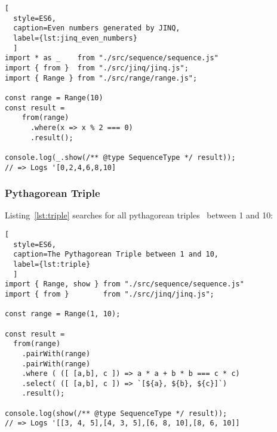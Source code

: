 \begin{lstlisting}[
  style=ES6, 
  caption=Even numbers generated by JINQ,
  label={lst:jinq_even_numbers}
  ]
import * as _    from "./src/sequence/sequence.js"
import { from }  from "./src/jinq/jinq.js";
import { Range } from "./src/range/range.js";

const range = Range(10)
const result =
    from(range)
      .where(x => x % 2 === 0)
      .result();

console.log(_.show(/** @type SequenceType */ result));
// => Logs '[0,2,4,6,8,10]
\end{lstlisting}

\subsubsection{Pythagorean Triple}
\label{subsub:JINQ_Pythagorean Triple}
Listing~\ref{lst:triple} searches for all pythagorean
triples~\cite{pythagorean_triple} between 1 and 10:

\begin{lstlisting}[
  style=ES6, 
  caption=The Pythagorean Triple between 1 and 10,
  label={lst:triple}
  ]
import { Range, show } from "./src/sequence/sequence.js"
import { from }        from "./src/jinq/jinq.js";

const range = Range(1, 10);

const result =
  from(range)
    .pairWith(range)
    .pairWith(range)
    .where ( ([ [a,b], c ]) => a * a + b * b === c * c)
    .select( ([ [a,b], c ]) => `[${a}, ${b}, ${c}]`)
    .result();

console.log(show(/** @type SequenceType */ result));
// => Logs '[[3, 4, 5],[4, 3, 5],[6, 8, 10],[8, 6, 10]]
\end{lstlisting}
